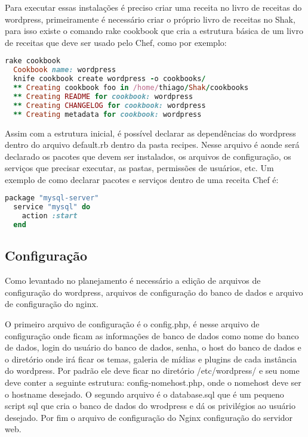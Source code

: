 Para executar essas instalações é preciso criar uma receita no livro de receitas
do wordpress, primeiramente é necessário criar o próprio livro de receitas no Shak,
para isso existe o comando rake cookbook que cria a estrutura básica
de um livro de receitas que deve ser usado pelo Chef, como por exemplo:

\begin{lstlisting}[language=Ruby,label=dice_index,caption={Exemplo de criação de estrutura básica de livro de receitas do wordpress com shak}]
  rake cookbook
  Cookbook name: wordpress
  knife cookbook create wordpress -o cookbooks/
  ** Creating cookbook foo in /home/thiago/Shak/cookbooks
  ** Creating README for cookbook: wordpress
  ** Creating CHANGELOG for cookbook: wordpress
  ** Creating metadata for cookbook: wordpress
\end{lstlisting}

Assim com a estrutura inicial, é possível declarar as dependências do wordpress
dentro do arquivo default.rb dentro da pasta recipes. Nesse arquivo é aonde
será declarado os pacotes que devem ser instalados, os arquivos de configuração,
os serviços que precisar executar, as pastas, permissões de usuários, etc. Um exemplo
de como declarar pacotes e serviços dentro de uma receita Chef é:

\begin{lstlisting}[language=Ruby,label=dice_index,caption={Exemplo de criação de serviço do mysql com o chef}]
  package "mysql-server"
  service "mysql" do
    action :start
  end
\end{lstlisting}


\subsection{Configuração}
\label{wordpress:preparacao}

Como levantado no planejamento é necessário a edição de arquivos de configuração
do wordpress, arquivos de configuração do banco de dados e arquivo de configuração
do nginx.

O primeiro arquivo de configuração é o config.php, é nesse arquivo de
configuração onde ficam as informações de banco de dados como nome do banco de dados,
login do usuário do banco de dados, senha, o host do banco de dados e o diretório
onde irá ficar os temas, galeria de mídias e plugins de cada instância do wordpress.
Por padrão ele deve ficar no diretório /etc/wordpress/ e seu nome deve conter
a seguinte estrutura: config-nomehost.php, onde o nomehost deve ser o hostname
desejado. O segundo arquivo é o database.sql que é um pequeno script sql que
cria o banco de dados do wrodpress e dá os privilégios ao usuário desejado. Por fim
o arquivo de configuração do Nginx configuração do servidor web.

